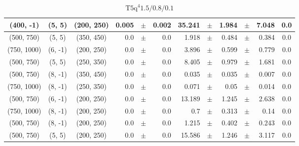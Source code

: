 \documentclass[12pt]{paper}
\newcommand{\TFiveqqqqHL}{\ensuremath{\textrm{T5q}^{4} 1.5/0.8/0.1}\xspace}
\begin{document}
\begin{table}[ht]
\begin{center}
{\begin{tabular}{|c|c|c|rrr|rrrrr|c|}
(400, -1)&(5, 5)&(200, 250)&0.005&$\pm$&0.002&35.241&$\pm$&1.984&$\pm$&7.048&0.0\\\hline
(500, 750)&(5, 5)&(350, 450)&0.0&$\pm$&0.0&1.918&$\pm$&0.484&$\pm$&0.384&0.0\\\hline
(750, 1000)&(6, -1)&(200, 250)&0.0&$\pm$&0.0&3.896&$\pm$&0.599&$\pm$&0.779&0.0\\\hline
(500, 750)&(5, 5)&(250, 350)&0.0&$\pm$&0.0&8.405&$\pm$&0.979&$\pm$&1.681&0.0\\\hline
(500, 750)&(8, -1)&(350, 450)&0.0&$\pm$&0.0&0.035&$\pm$&0.035&$\pm$&0.007&0.0\\\hline
(750, 1000)&(8, -1)&(250, 350)&0.0&$\pm$&0.0&0.071&$\pm$&0.05&$\pm$&0.014&0.0\\\hline
(500, 750)&(6, -1)&(200, 250)&0.0&$\pm$&0.0&13.189&$\pm$&1.245&$\pm$&2.638&0.0\\\hline
(750, 1000)&(8, -1)&(200, 250)&0.0&$\pm$&0.0&0.7&$\pm$&0.313&$\pm$&0.14&0.0\\\hline
(500, 750)&(8, -1)&(200, 250)&0.0&$\pm$&0.0&1.215&$\pm$&0.402&$\pm$&0.243&0.0\\\hline
(500, 750)&(5, 5)&(200, 250)&0.0&$\pm$&0.0&15.586&$\pm$&1.246&$\pm$&3.117&0.0\\\hline
\end{tabular}}\end{center}\caption{\TFiveqqqqHL}\end{table}
\end{document}
